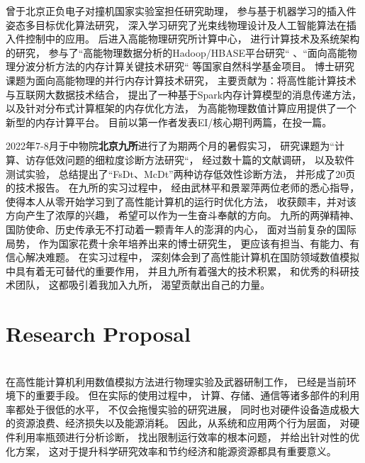 \documentclass[a4paper]{resume-openfont}
\newcommand{\projectHeading}[2]{\Project{#1}
\descript{#2}\\}
\begin{document}
\qquad 曾于北京正负电子对撞机国家实验室担任研究助理，
参与基于机器学习的插入件姿态多目标优化算法研究，
深入学习研究了光束线物理设计及人工智能算法在插入件控制中的应用。
后进入高能物理研究所计算中心，
进行计算技术及系统架构的研究，
参与了“高能物理数据分析的Hadoop/HBASE平台研究“
、“面向高能物理分波分析方法的内存计算关键技术研究“
等国家自然科学基金项目。
博士研究课题为面向高能物理的并行内存计算技术研究，
主要贡献为：将高性能计算技术与互联网大数据技术结合，
提出了一种基于Spark内存计算模型的消息传递方法，
以及针对分布式计算框架的内存优化方法，
为高能物理数值计算应用提供了一个新型的内存计算平台。
目前以第一作者发表EI/核心期刊两篇，在投一篇。

\qquad 2022年7-8月于中物院\textbf{北京九所}进行了为期两个月的暑假实习，
研究课题为“计算、访存低效问题的细粒度诊断方法研究“，
经过数十篇的文献调研，
以及软件测试实验，
总结提出了“FsDt、McDt”两种访存低效性诊断方法，
并形成了20页的技术报告。
在九所的实习过程中，
经由武林平和景翠萍两位老师的悉心指导，
使得本人从零开始学习到了高性能计算机的运行时优化方法，
收获颇丰，并对该方向产生了浓厚的兴趣，
希望可以作为一生奋斗奉献的方向。
九所的两弹精神、国防使命、历史传承无不打动着一颗青年人的澎湃的内心，
面对当前复杂的国际局势，
作为国家花费十余年培养出来的博士研究生，
更应该有担当、有能力、有信心解决难题。
在实习过程中，
深刻体会到了高性能计算机在国防领域数值模拟中具有着无可替代的重要作用，
并且九所有着强大的技术积累，
和优秀的科研技术团队，
这都吸引着我加入九所，
渴望贡献出自己的力量。

\bigbreak
\medbreak
\smallbreak
\sectionsep

\sectionsep


\section{Research Proposal}

\projectHeading{研究计划1：高性能计算机运行时优化}{}
\quad 在高性能计算机利用数值模拟方法进行物理实验及武器研制工作，
已经是当前环境下的重要手段。
但在实际的使用过程中，
计算、存储、通信等诸多部件的利用率都处于很低的水平，
不仅会拖慢实验的研究进展，
同时也对硬件设备造成极大的资源浪费、经济损失以及能源消耗。
因此，从系统和应用两个行为层面，
对硬件利用率瓶颈进行分析诊断，
找出限制运行效率的根本问题，
并给出针对性的优化方案，
这对于提升科学研究效率和节约经济和能源资源都具有重要意义。
\end{document}
